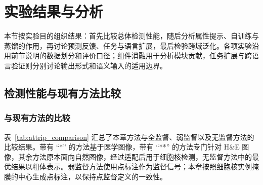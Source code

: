 \section{实验结果与分析}

本节按实验目的组织结果：首先比较总体检测性能，随后分析属性提示、自训练与蒸馏的作用，再讨论预测反馈、任务与语言扩展，最后检验跨域泛化。各项实验沿用前节说明的数据划分和评价口径；组件消融用于分析模块贡献，任务扩展与跨语言验证则分别讨论输出形式和语义输入的适用边界。

\subsection{检测性能与现有方法比较}

\subsubsection{与现有方法的比较}

表~\ref{tab:attrip_comparison} 汇总了本章方法与全监督、弱监督以及无监督方法的比较结果。带有 ``*'' 的方法基于医学图像，带有 ``**'' 的方法专门针对 H\&E 图像，其余方法原本面向自然图像，经过适配后用于细胞核检测，无监督方法中的最优结果以粗体表示。弱监督方法使用点标注作为监督信号；本章按照细胞核实例掩膜的中心生成点标注，以保持点监督定义的一致性。

